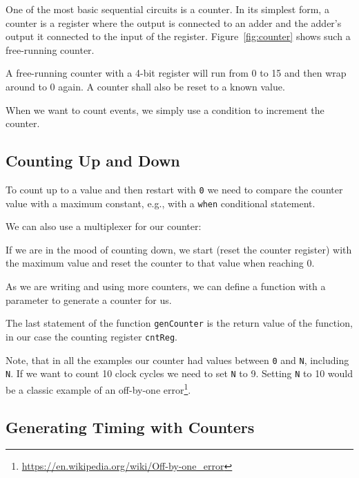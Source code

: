 \documentclass[%
    10pt,
    headinclude, footexclude,
    openright, %
    notitlepage,
    cleardoubleempty,
    headsepline,
    pointlessnumbers,
    bibtotoc, idxtotoc,
    ]{scrbook}
\newcommand{\code}[1]{{\small{\texttt{#1}}}}
\newcommand{\myref}[2]{\href{#1}{#2}}
\renewcommand{\myref}[2]{{#2}{\footnote{\url{#1}}}}
\begin{document}
One of the most basic sequential circuits is a counter. In its simplest form, a counter is a register
where the output is connected to an adder and the adder's output it connected to the input
of the register. Figure~\ref{fig:counter} shows such a free-running counter.

A free-running counter with a 4-bit register will run from 0 to 15 and then wrap around
to 0 again. A counter shall also be reset to a known value.


\noindent When we want to count events, we simply use a condition to  increment the counter.


\subsection{Counting Up and Down}

To count up to a value and then restart with \code{0} we need to compare
the counter value with a maximum constant, e.g., with a \code{when}
conditional statement.


\noindent We can also use a multiplexer for our counter:


\noindent If we are in the mood of counting down, we start (reset the counter register)
with the maximum value and reset the counter to that value when reaching 0.


\noindent As we are writing and using more counters, we can
define a function with a parameter to generate a counter for us.


\noindent The last statement of the function \code{genCounter} is the return
value of the function, in our case the counting register \code{cntReg}.

Note, that in all the examples our counter had values between \code{0} and
\code{N}, including \code{N}. If we want to count 10 clock cycles we need
to set \code{N} to 9. Setting \code{N} to 10 would be a classic example of an
\myref{https://en.wikipedia.org/wiki/Off-by-one_error}{off-by-one error}.

\subsection{Generating Timing with Counters}
\end{document}
